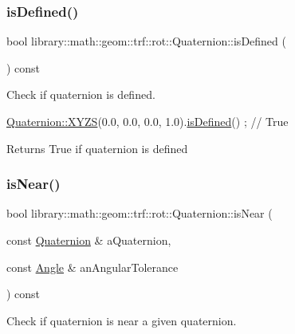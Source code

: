 \subsubsection{\texorpdfstring{is\+Defined()}{isDefined()}}
{\footnotesize\ttfamily bool library\+::math\+::geom\+::trf\+::rot\+::\+Quaternion\+::is\+Defined (\begin{DoxyParamCaption}{ }\end{DoxyParamCaption}) const}



Check if quaternion is defined. 


\begin{DoxyCode}
\hyperlink{classlibrary_1_1math_1_1geom_1_1trf_1_1rot_1_1_quaternion_afff9523c7dcbfbbc521736121e62ad41}{Quaternion::XYZS}(0.0, 0.0, 0.0, 1.0).\hyperlink{classlibrary_1_1math_1_1geom_1_1trf_1_1rot_1_1_quaternion_a0d74102b65b5fdb0cd92f37455cf8c66}{isDefined}() ; \textcolor{comment}{// True}
\end{DoxyCode}


\begin{DoxyReturn}{Returns}
True if quaternion is defined 
\end{DoxyReturn}
\mbox{\label{classlibrary_1_1math_1_1geom_1_1trf_1_1rot_1_1_quaternion_ac445a1089b34c5650ce47f2f8873d7b1}} 
\subsubsection{\texorpdfstring{is\+Near()}{isNear()}}
{\footnotesize\ttfamily bool library\+::math\+::geom\+::trf\+::rot\+::\+Quaternion\+::is\+Near (\begin{DoxyParamCaption}\item[{const \hyperlink{classlibrary_1_1math_1_1geom_1_1trf_1_1rot_1_1_quaternion}{Quaternion} \&}]{a\+Quaternion,  }\item[{const \hyperlink{classlibrary_1_1math_1_1geom_1_1_angle}{Angle} \&}]{an\+Angular\+Tolerance }\end{DoxyParamCaption}) const}



Check if quaternion is near a given quaternion. 


